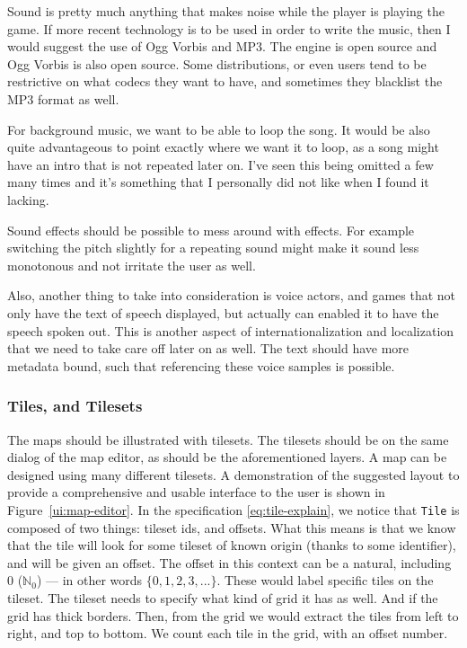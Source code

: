 Sound is pretty much anything that makes noise while the player is playing the
game. If more recent technology is to be used in order to write the music, then
I would suggest the use of Ogg Vorbis and MP3. The engine is open source and Ogg
Vorbis is also open source. Some distributions, or even users tend to be
restrictive on what codecs they want to have, and sometimes they blacklist the
MP3 format as well.

For background music, we want to be able to loop the song. It would be also
quite advantageous to point exactly where we want it to loop, as a song might
have an intro that is not repeated later on. I've seen this being omitted a few
many times and it's something that I personally did not like when I found it
lacking.

Sound effects should be possible to mess around with effects. For example
switching the pitch slightly for a repeating sound might make it sound less
monotonous and not irritate the user as well.

Also, another thing to take into consideration is voice actors, and games that
not only have the text of speech displayed, but actually can enabled it to have
the speech spoken out. This is another aspect of internationalization and
localization that we need to take care off later on as well. The text should
have more metadata bound, such that referencing these voice samples is possible.

\subsubsection{Tiles, and Tilesets}

The maps should be illustrated with tilesets. The tilesets should be on the
same dialog of the map editor, as should be the aforementioned layers. A map
can be designed using many different tilesets. A demonstration of the
suggested layout to provide a comprehensive and usable interface to the user
is shown in Figure~\ref{ui:map-editor}. In the specification
\ref{eq:tile-explain}, we notice that \texttt{Tile} is composed of two things:
tileset ids, and offsets. What this means is that we know that the tile will
look for some tileset of known origin (thanks to some identifier), and will be
given an offset. The offset in this context can be a natural, including 0
($\mathbb{N}_0$) --- in other words $\{ 0, 1, 2, 3, ... \}$. These would label
specific tiles on the tileset. The tileset needs to specify what kind of grid
it has as well. And if the grid has thick borders. Then, from the grid we would
extract the tiles from left to right, and top to bottom. We count each tile in
the grid, with an offset number.

